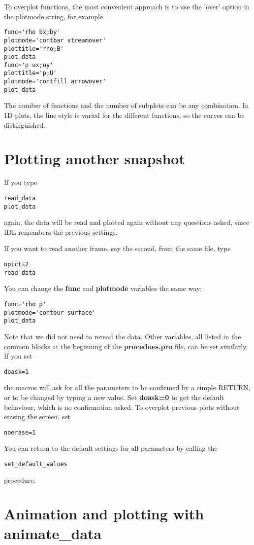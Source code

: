 \documentclass{article}
\begin{document}
To overplot functions, the most convenient approach
is to use the 'over' option in the plotmode string, for example
\begin{verbatim}
func='rho bx;by'
plotmode='contbar streamover'
plottitle='rho;B'
plot_data
func='p ux;uy'
plottitle='p;U'
plotmode='contfill arrowover'
plot_data
\end{verbatim}
The number of functions and the number of subplots can be any combination.
In 1D plots, the line style is varied for the different 
functions, so the curves can be distinguished.

\section{Plotting another snapshot \label{s-plot-another}}

If you type
\begin{verbatim}
read_data
plot_data
\end{verbatim}
again, the data will be read and plotted again without any questions asked,
since IDL remembers the previous settings. 

If you want to read another frame, say the second, from the same file, type
\begin{verbatim}
npict=2
read_data
\end{verbatim}
You can change the {\bf func} and {\bf plotmode} variables the same way:
\begin{verbatim}
func='rho p'
plotmode='contour surface'
plot_data
\end{verbatim}
Note that we did not need to reread the data.
Other variables, all listed in the common blocks at the beginning of the
{\bf procedues.pro} file, can be set similarly.
If you set
\begin{verbatim}
doask=1
\end{verbatim}
the macros will ask for all the parameters to be confirmed by a simple
RETURN, or to be changed by typing a new value. Set {\bf doask=0} to
get the default behaviour, which is no confirmation asked.
To overplot previous plots without erasing the screen, set
\begin{verbatim}
noerase=1
\end{verbatim}
You can return to the default settings for all parameters by calling the
\begin{verbatim}
set_default_values
\end{verbatim}
procedure.

\section{Animation and plotting with animate\_data \label{s-animate}}
\end{document}
